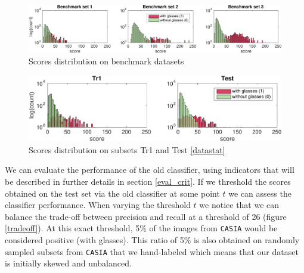 \documentclass[a4paper]{article}
\begin{document}
	\begin{figure}[H]
	    \centering
	    \includegraphics[width=17cm]{old_classifier/benchmark}
	    \caption{Scores distribution on benchmark datasets\label{bench}}
	\end{figure}
    \begin{figure}[H]
        \centering
        \includegraphics[width=12cm]{old_classifier/benchmark_trte}
        \caption{Scores distribution on subsets Tr1 and Test \ref{datastat}}
    \end{figure}
    We can evaluate the performance of the old classifier, using indicators that will be described in further details in section \ref{eval_crit}. If we threshold the scores obtained on the test set via the old classifier at some point $t$ we can assess the classifier performance. When varying the threshold $t$ we notice that we can balance the trade-off between precision and recall at a threshold of 26 (figure \ref{tradeoff}). At this exact threshold, 5\% of the images from \texttt{CASIA} would be considered positive (with glasses). This ratio of 5\% is also obtained on randomly sampled subsets from \texttt{CASIA} that we hand-labeled which means that our dataset is initially skewed and unbalanced.
\end{document}

